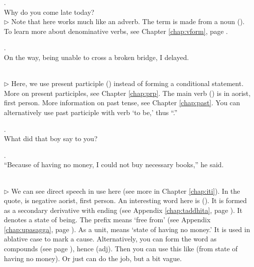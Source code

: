 \medskip
{}. \\
\hspace*{12mm}Why do you come late today?\\
{\small $\triangleright$ Note that  here works much like an adverb. The term is made from a noun (). To learn more about denominative verbs, see Chapter \ref{chap:vform}, page \pageref{sec:denomverbs}.}

\medskip
\parbox[lt]{0.93\linewidth}{\raggedright{}. \\
\hspace*{6mm}On the way, being unable to cross a broken bridge, I delayed.}\\[1mm]
{\small $\triangleright$ Here, we use present participle () instead of forming a conditional statement. More on present participles, see Chapter \ref{chap:prp}. The main verb () is in aorist, first person. More information on past tense, see Chapter \ref{chap:past}. You can alternatively use past participle with verb `to be,' thus ``.''}

\medskip
{}. \\
\hspace*{12mm}What did that boy say to you?\\

\label{conv:nimmuu}\medskip
\parbox[lt]{0.93\linewidth}{\raggedright{}. \\
\hspace*{6mm}``Because of having no money, I could not buy necessary books,'' he said.}\\[1mm]
{\small $\triangleright$ We can see direct speech in use here (see more in Chapter \ref{chap:iti}). In the quote,  is negative aorist, first person. An interesting word here is  (). It is formed as a secondary derivative with  ending (see Appendix \ref{chap:taddhita}, page \pageref{pacct8:tta}). It denotes a state of being. The prefix  means `free from' (see Appendix \ref{chap:upasagga}, page \pageref{upasagga:ni}). As a unit,  means `state of having no money.' It is used in ablative case to mark a cause. Alternatively, you can form the word as  compounds (see page \pageref{sec:abyayi}), hence  (adj). Then you can use this like  (from state of having no money). Or just  can do the job, but a bit vague.}

